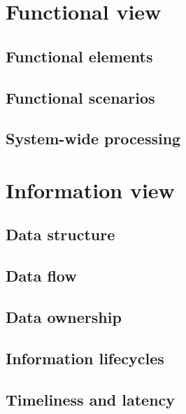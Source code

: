 \documentclass[a4paper,11pt]{report}
\begin{document}
\section{Functional view}
\label{sec:functional-view}


\subsection{Functional elements}
\label{sec:functional-elements}


\subsection{Functional scenarios}
\label{sec:functional-scenarios-1}


\subsection{System-wide processing}
\label{sec:syst-wide-proc}


\section{Information view}
\label{cha:information-view}


\subsection{Data structure}
\label{sec:data-structure}


\subsection{Data flow}
\label{sec:data-flow}


\subsection{Data ownership}
\label{sec:data-ownership}


\subsection{Information lifecycles}
\label{sec:inform-lifecycl}


\subsection{Timeliness and latency}
\label{sec:timeliness-latency}
\end{document}
